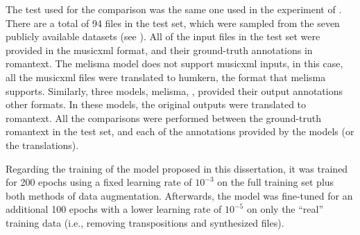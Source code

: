 
The test used for the comparison was the same one used in
the experiment of .
There are a total of 94 files in the test set, which were
sampled from the seven publicly available datasets (see
). All of the input files
in the test set were provided in the \gls{musicxml} format,
and their ground-truth annotations in \gls{romantext}. The
\gls{melisma} model does not support \gls{musicxml} inputs,
in this case, all the \gls{musicxml} files were translated
to \gls{humkern}, the format that \gls{melisma} supports.
Similarly, three models, \gls{melisma},
\textcite{chen2021attend, mcleod2021modular}, provided their
output annotations other formats. In these models, the
original outputs were translated to \gls{romantext}. All the
comparisons were performed between the ground-truth
\gls{romantext} in the test set, and each of the annotations
provided by the models (or the translations). 

Regarding the training of the model proposed in this
dissertation, it was trained for 200 epochs using a fixed
learning rate of $10^{-3}$ on the full training set plus
both methods of data augmentation. Afterwards, the model was
fine-tuned for an additional 100 epochs with a lower
learning rate of $10^{-5}$ on only the ``real'' training
data (i.e., removing transpositions and synthesized files).

